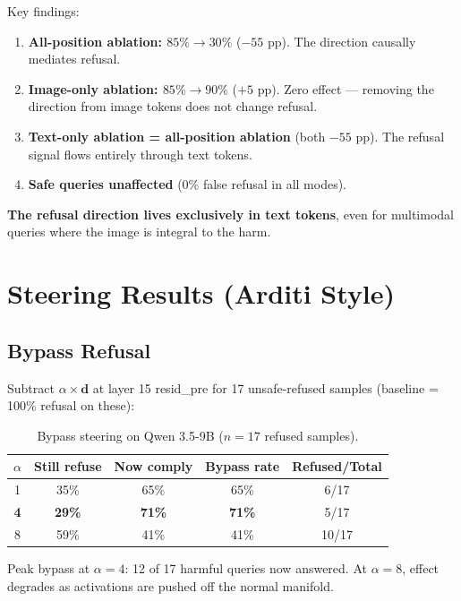 \documentclass[11pt,a4paper]{article}
\begin{document}
Key findings:
\begin{enumerate}[nosep]
  \item \textbf{All-position ablation: $85\% \to 30\%$} ($-55$ pp). The direction causally mediates refusal.
  \item \textbf{Image-only ablation: $85\% \to 90\%$} ($+5$ pp). Zero effect --- removing the direction from image tokens does not change refusal.
  \item \textbf{Text-only ablation = all-position ablation} (both $-55$ pp). The refusal signal flows entirely through text tokens.
  \item \textbf{Safe queries unaffected} (0\% false refusal in all modes).
\end{enumerate}

\textbf{The refusal direction lives exclusively in text tokens}, even for multimodal queries where the image is integral to the harm.

\section{Steering Results (Arditi Style)}

\subsection{Bypass Refusal}

Subtract $\alpha \times \mathbf{d}$ at layer 15 resid\_pre for 17 unsafe-refused samples (baseline = 100\% refusal on these):

\begin{table}[H]\centering
\caption{Bypass steering on Qwen 3.5-9B ($n=17$ refused samples).}
\begin{tabular}{ccccc}
\toprule
$\alpha$ & \textbf{Still refuse} & \textbf{Now comply} & \textbf{Bypass rate} & \textbf{Refused/Total} \\
\midrule
1 & 35\% & 65\% & 65\% & 6/17 \\
\textbf{4} & \textbf{29\%} & \textbf{71\%} & \textbf{71\%} & 5/17 \\
8 & 59\% & 41\% & 41\% & 10/17 \\
\bottomrule
\end{tabular}
\end{table}

Peak bypass at $\alpha=4$: 12 of 17 harmful queries now answered. At $\alpha=8$, effect degrades as activations are pushed off the normal manifold.
\end{document}

